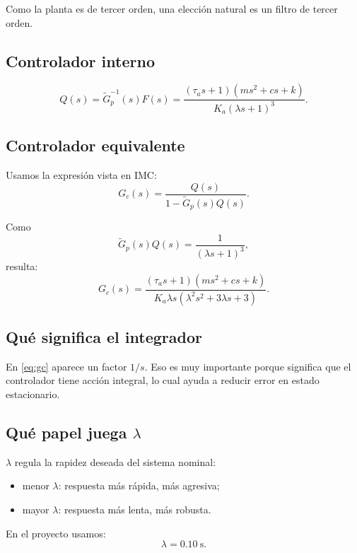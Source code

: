 \documentclass[11pt]{article}
\begin{document}
Como la planta es de tercer orden, una elecci\'on natural es un filtro de tercer orden.

\subsection{Controlador interno}

\begin{equation}
Q(s)=\tilde{G}_p^{-1}(s)F(s)
=
\frac{(\tau_as+1)(ms^2+cs+k)}{K_a(\lambda s+1)^3}.
\end{equation}

\subsection{Controlador equivalente}

Usamos la expresi\'on vista en IMC:
\begin{equation}
G_c(s)=\frac{Q(s)}{1-\tilde{G}_p(s)Q(s)}.
\end{equation}

Como
\[
\tilde{G}_p(s)Q(s)=\frac{1}{(\lambda s+1)^3},
\]
resulta:
\begin{equation}
G_c(s)=
\frac{(\tau_as+1)(ms^2+cs+k)}
{K_a\lambda s(\lambda^2s^2+3\lambda s+3)}.
\label{eq:gc}
\end{equation}

\subsection{Qu\'e significa el integrador}

En \eqref{eq:gc} aparece un factor $1/s$. Eso es muy importante porque significa que el controlador tiene acci\'on integral, lo cual ayuda a reducir error en estado estacionario.

\subsection{Qu\'e papel juega $\lambda$}

$\lambda$ regula la rapidez deseada del sistema nominal:

\begin{itemize}[leftmargin=1.2cm]
\item menor $\lambda$: respuesta m\'as r\'apida, m\'as agresiva;
\item mayor $\lambda$: respuesta m\'as lenta, m\'as robusta.
\end{itemize}

En el proyecto usamos:
\[
\lambda = 0.10\ \text{s}.
\]
\end{document}
